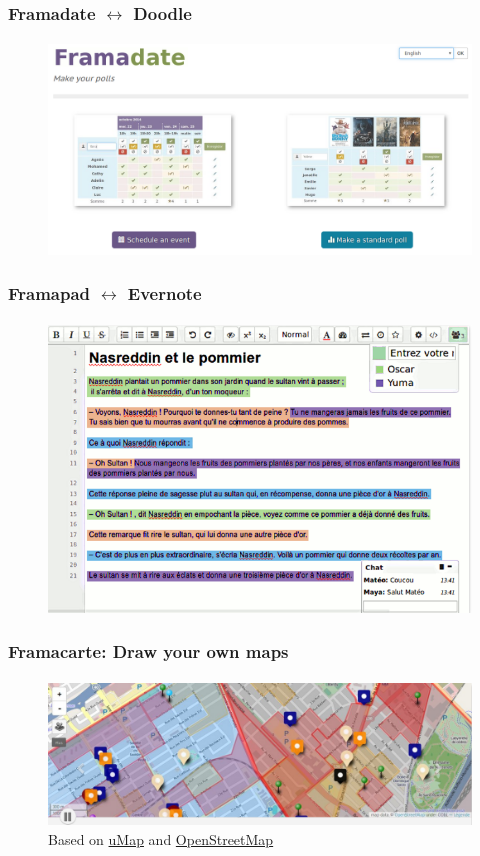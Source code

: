 	\begin{frame}
	\frametitle{Framadate $\leftrightarrow$ Doodle}
	\framesubtitle{}
	        \begin{figure}[h]
                \centering
                \includegraphics[width=.8\textwidth]{../pics/framadate}
        	\end{figure}
	\end{frame}

	\begin{frame}
	\frametitle{Framapad $\leftrightarrow$ Evernote}
	\framesubtitle{}
	        \begin{figure}[h]
                \centering
                \includegraphics[width=.8\textwidth]{../pics/framapad}
        	\end{figure}
	\end{frame}

	\begin{frame}
	\frametitle{Framacarte: Draw your own maps}
	\framesubtitle{}
	        \begin{figure}[h]
                \centering
                \includegraphics[width=.8\textwidth]{../pics/framacarte}
		\caption{Based on \href{https://github.com/umap-project/umap/}{uMap} and \href{https://www.openstreetmap.org}{OpenStreetMap}} 
        	\end{figure}
	\end{frame}

